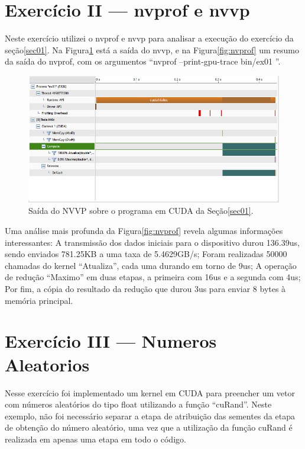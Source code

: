\documentclass[conference]{IEEEtran}
\begin{document}
\section{Exercício II --- nvprof e nvvp\label{sec:ex02}}
Neste exercício utilizei o nvprof e nvvp para analisar a execução do exercício da seção\ref{sec01}. Na Figura\ref{fig:nvvp} está a saída do nvvp, e na Figura\ref{fig:nvprof} um resumo da saída do nvprof, com os argumentos ``nvprof --print-gpu-trace bin/ex01 ''.

\begin{figure}
  \centering
\includegraphics[width=\textwidth] {figs/nvvp}
\caption{Saída do NVVP sobre o programa em CUDA da Seção\ref{sec01}.}
\label{fig:nvvp}
\end{figure}

Uma análise mais profunda da Figura\ref{fig:nvprof} revela algumas informações interessantes:
A transmissão dos dados iniciais para o dispositivo durou 136.39us, sendo enviados 781.25KB a uma taxa de 5.4629GB/s;
Foram realizadas 50000 chamadas do kernel ``Atualiza'', cada uma durando em torno de 9us;
A operação de redução ``Maximo'' em duas etapas, a primeira com 16us e a segunda com 4us;
Por fim, a cópia do resultado da redução que durou 3us para enviar 8 bytes à memória principal.

\section{Exercício III --- Numeros Aleatorios\label{sec:ex03}}
Nesse exercício foi implementado um kernel em CUDA para preencher um vetor com números aleatórios do tipo float utilizando a função ``cuRand''.
Neste exemplo, não foi necessário separar a etapa de atribuição das sementes da etapa de obtenção do número aleatório, uma vez que a utilização da função cuRand é realizada em apenas uma etapa em todo o código.
\end{document}
